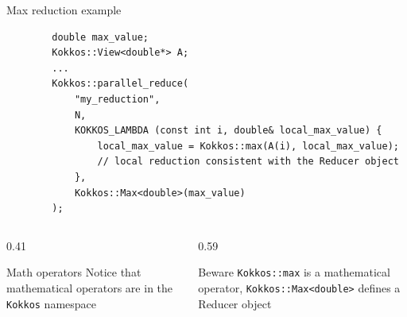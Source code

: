 \documentclass[
    aspectratio=169,
]{beamer}
\begin{document}
\begin{frame}[fragile]{Max reduction example}
    \begin{verbatim}
        double max_value;
        Kokkos::View<double*> A;
        ...
        Kokkos::parallel_reduce(
            "my_reduction",
            N,
            KOKKOS_LAMBDA (const int i, double& local_max_value) {
                local_max_value = Kokkos::max(A(i), local_max_value);
                // local reduction consistent with the Reducer object
            },
            Kokkos::Max<double>(max_value)
        );
    \end{verbatim}

    \pause

    \vspace{-1em}

    \begin{columns}[T]
        \begin{column}{0.41\linewidth}
            \begin{block}{Math operators}
                Notice that mathematical operators are in the \texttt{Kokkos} namespace
            \end{block}
        \end{column}
        \pause
        \begin{column}{0.59\linewidth}
            \begin{block}{Beware}
                \texttt{Kokkos::max} is a mathematical operator, \texttt{Kokkos::Max<double>} defines a Reducer object
            \end{block}
        \end{column}
    \end{columns}
\end{frame}
\end{document}
